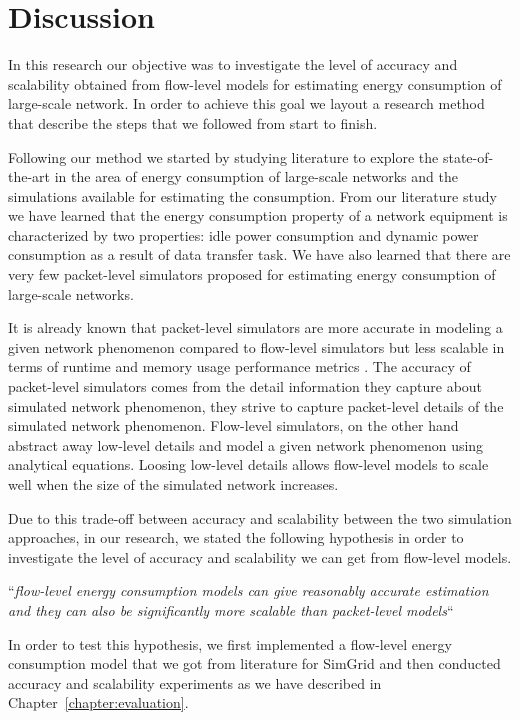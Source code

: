 \chapter{Discussion}
\label{chapter:discussion}

In this research our objective was to investigate the level of accuracy and scalability obtained from flow-level models for estimating energy consumption of large-scale network. In order to achieve this goal we layout a research method that describe the steps that we followed from start to finish. 

Following our method we started by studying literature to explore the state-of-the-art in the area of energy consumption of large-scale networks and the simulations available for estimating the consumption. From our literature study we have learned that the energy consumption property of a network equipment is characterized by two properties: idle power consumption and dynamic power consumption as a result of data transfer task. We have also learned that there are very few packet-level simulators proposed for estimating energy consumption of large-scale networks.

It is already known that packet-level simulators are more accurate in modeling a given network phenomenon compared to flow-level simulators but less scalable in terms of runtime and memory usage performance metrics \cite{DBLP:conf/infocom/LiuFGKT01}. The accuracy of packet-level simulators comes from the detail information they capture about simulated network phenomenon, they strive to capture packet-level details of the simulated network phenomenon. Flow-level simulators, on the other hand abstract away low-level details and model a given network phenomenon using analytical equations. Loosing low-level details allows flow-level models to scale well when the size of the simulated network increases. 

Due to this trade-off between accuracy and scalability between the two simulation approaches, in our research, we stated the following hypothesis in order to investigate the level of accuracy and scalability we can get from flow-level models.

``\emph{flow-level energy consumption models can give reasonably accurate estimation and they can also be significantly more scalable than packet-level models}``

In order to test this hypothesis, we first implemented a flow-level energy consumption model that we got from literature for SimGrid and then conducted accuracy and scalability experiments as we have described in Chapter~\ref{chapter:evaluation}. 

